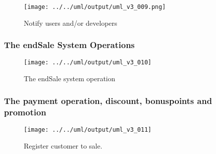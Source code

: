 \documentclass[a4paper]{scrreprt}
\newenvironment{longlisting}{\captionsetup{type=listing}}{}
\begin{document}
\begin{figure}[H]
    \begin{center}
        \texttt{[image: ../../uml/output/uml\_v3\_009.png]}
        \caption{Notify users and/or developers}
        \label{fig:notify-users-developers}
    \end{center}
\end{figure}

\subsubsection*{The endSale System Operations}
\begin{figure}[H]
    \begin{center}
        \texttt{[image: ../../uml/output/uml\_v3\_010]}
        \caption{The endSale system operation}
        \label{fig:end-sale}
    \end{center}
\end{figure}
%
%

\subsubsection*{The payment operation, discount, bonuspoints and promotion}
\begin{figure}[H]
    \begin{center}
        \texttt{[image: ../../uml/output/uml\_v3\_011]}
        \caption{Register customer to sale.}
        \label{fig:reg-customer}
    \end{center}
\end{figure}
\end{document}
